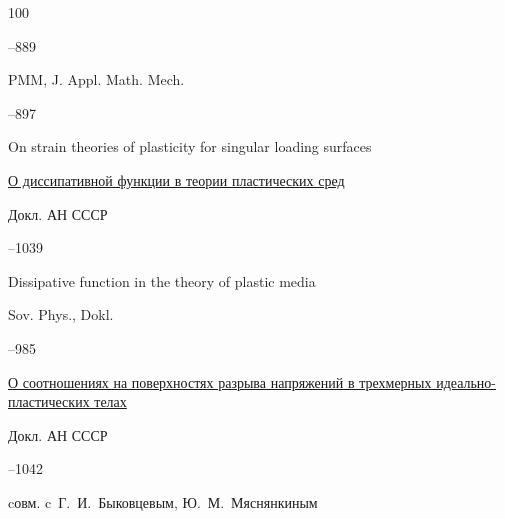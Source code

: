 \begin{thebibliography}{100}



–889


\transl

\jour PMM, J. Appl. Math. Mech. 



--897

\paper On strain theories of plasticity for singular loading surfaces





\paper \href{https://zbmath.org/?q=an:0162.56801}{О диссипативной функции в теории пластических сред}

\jour Докл. АН СССР




–1039


\transl


\paper Dissipative function in the theory of plastic media

\jour Sov. Phys., Dokl. 


--985 







\paper \href{https://zbmath.org/?q=an:0176.25903}{О соотношениях на поверхностях разрыва напряжений в трехмерных идеально-пластических телах}

\jour Докл. АН СССР




–1042 

\miscnote cовм. c~Г.~И.~Быковцевым, Ю.~М.~Мяснянкиным


\transl


\end{thebibliography}
